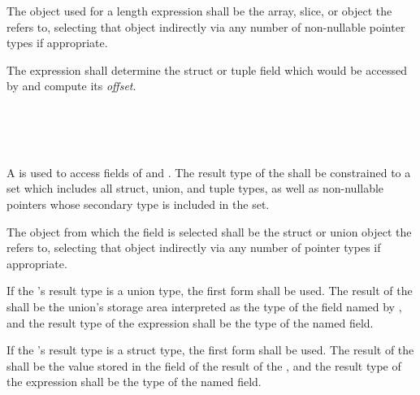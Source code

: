 \specsubsubitem
The object used for a length expression shall be the array, slice, or
 object the  refers to, selecting that
object indirectly via any number of non-nullable pointer types if appropriate.

\specsubsubitem
The  expression shall determine the struct or tuple field
which would be accessed by  and compute
its \textit{offset}.


\begin{grammar}
 \\
	   \\
	   \\
\end{grammar}

\specsubsubitem
A  is used to access fields of
 and . The result type
of the  shall be constrained to a set which
includes all struct, union, and tuple types, as well as non-nullable pointers
whose secondary type is included in the set.


\specsubsubitem
The object from which the field is selected shall be the struct or union object
the  refers to, selecting that object indirectly
via any number of pointer types if appropriate.

\specsubsubitem
If the 's result type is a union type, the
first form shall be used. The result of the
 shall be the union's storage area
interpreted as the type of the field named by , and the
result type of the expression shall be the type of the named field.

\specsubsubitem
If the 's result type is a struct type, the
first form shall be used. The result of the
 shall be the value stored in the
 field of the result of the ,
and the result type of the expression shall be the type of the named field.

